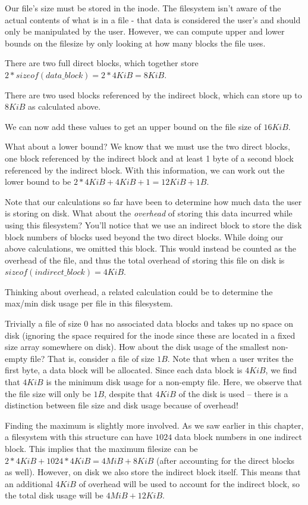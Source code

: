 Our file's size must be stored in the inode.
The filesystem isn't aware of the actual contents of what is in a file - that data is considered the user's and should only be manipulated by the user.
However, we can compute upper and lower bounds on the filesize by only looking at how many blocks the file uses.

There are two full direct blocks, which together store $2*sizeof(data\_block)=2*4KiB=8KiB$.

There are two used blocks referenced by the indirect block, which can store up to $8KiB$ as calculated above.

We can now add these values to get an upper bound on the file size of $16KiB$.

What about a lower bound? We know that we must use the two direct blocks, one block referenced by the indirect block and at least 1 byte of a
second block referenced by the indirect block.
With this information, we can work out the lower bound to be $2*4KiB+4KiB+1=12KiB+1B$.

Note that our calculations so far have been to determine how much data the user is storing on disk.
What about the \textit{overhead} of storing this data incurred while using this filesystem?
You'll notice that we use an indirect block to store the disk block numbers of blocks used beyond the two direct blocks.
While doing our above calculations, we omitted this block.
This would instead be counted as the overhead of the file, and thus the total overhead of storing this file on disk is $sizeof(indirect\_block)=4KiB$.

Thinking about overhead, a related calculation could be to determine the max/min disk usage per file in this filesystem.

Trivially a file of size $0$ has no associated data blocks and takes up no space on disk (ignoring the space required for the inode since these are located in a fixed size array somewhere on disk).
How about the disk usage of the smallest non-empty file? That is, consider a file of size $1B$.
Note that when a user writes the first byte, a data block will be allocated.
Since each data block is $4KiB$, we find that $4KiB$ is the minimum disk usage for a non-empty file.
Here, we observe that the file size will only be $1B$, despite that $4KiB$ of the disk is used -- there is a distinction between file size and disk usage because of overhead!

Finding the maximum is slightly more involved.
As we saw earlier in this chapter, a filesystem with this structure can have $1024$ data block numbers in one indirect block.
This implies that the maximum filesize can be $2*4KiB + 1024*4KiB = 4MiB + 8KiB$ (after accounting for the direct blocks as well).
However, on disk we also store the indirect block itself.
This means that an additional $4KiB$ of overhead will be used to account for the indirect block, so the total disk usage will be $4MiB + 12KiB$.

